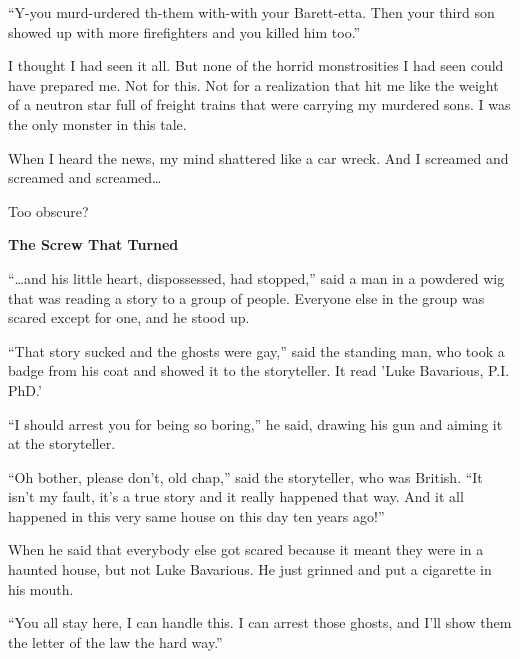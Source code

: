 ``Y-you murd-urdered th-them with-with your Barett-etta. Then
your third son showed up with more firefighters and you killed him
too.''



I thought I had seen it all. But none of the horrid monstrosities I
had seen could have prepared me. Not for this. Not for a
realization that hit me like the weight of a neutron star full of
freight trains that were carrying my murdered sons. I was the only
monster in this tale.



When I heard the news, my mind shattered like a car wreck. And I
screamed and screamed and screamed{\ldots}


 





Too obscure?



{\bf The Screw That Turned}



``{\ldots}and his little heart, dispossessed, had stopped,'' said a man in
a powdered wig that was reading a story to a group of people.
Everyone else in the group was scared except for one, and he stood
up.



``That story sucked and the ghosts were gay,'' said the standing man,
who took a badge from his coat and showed it to the storyteller. It
read 'Luke Bavarious, P.I. PhD.'



``I should arrest you for being so boring,'' he said, drawing his gun
and aiming it at the storyteller.



``Oh bother, please don't, old chap,'' said the storyteller, who was
British. ``It isn't my fault, it's a true story and it really
happened that way. And it all happened in this very same house on
this day ten years ago!''



When he said that everybody else got scared because it meant they
were in a haunted house, but not Luke Bavarious. He just grinned
and put a cigarette in his mouth.



``You all stay here, I can handle this. I can arrest those ghosts,
and I'll show them the letter of the law the hard way.''



